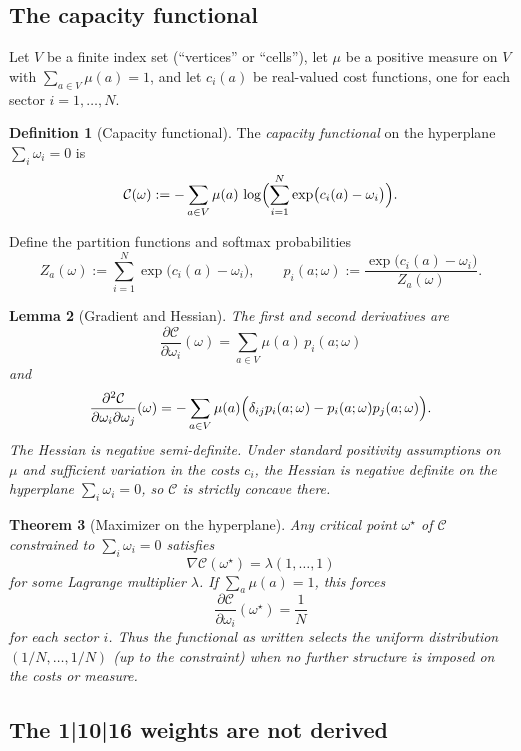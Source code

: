 \documentclass[11pt]{article}
\theoremstyle{plain}
\newtheorem{theorem}{Theorem}[section]
\newtheorem{lemma}[theorem]{Lemma}
\theoremstyle{definition}
\newtheorem{definition}[theorem]{Definition}
\theoremstyle{remark}
\numberwithin{equation}{section}
\newcommand{\capacity}{\mathcal{C}}
\begin{document}
\subsection{The capacity functional}

Let $V$ be a finite index set (``vertices'' or ``cells''), let $\mu$ be a positive measure on $V$ with $\sum_{a\in V}\mu(a)=1$, and let $c_i(a)$ be real-valued cost functions, one for each sector $i=1,\dots,N$.

\begin{definition}[Capacity functional]\label{def:capacity}
The \emph{capacity functional} on the hyperplane $\sum_i\omega_i=0$ is
\[
\capacity(\omega) := -\sum_{a\in V}\mu(a)\,\log\Bigl(\sum_{i=1}^N\exp\bigl(c_i(a)-\omega_i\bigr)\Bigr).
\]
\end{definition}

Define the partition functions and softmax probabilities
\[
Z_a(\omega) := \sum_{i=1}^N\exp\bigl(c_i(a)-\omega_i\bigr),\qquad
p_i(a;\omega) := \frac{\exp\bigl(c_i(a)-\omega_i\bigr)}{Z_a(\omega)}.
\]

\begin{lemma}[Gradient and Hessian]\label{lem:capacity-derivatives}
The first and second derivatives are
\[
\frac{\partial\capacity}{\partial\omega_i}(\omega) = \sum_{a\in V}\mu(a)\,p_i(a;\omega)
\]
and
\[
\frac{\partial^2\capacity}{\partial\omega_i\partial\omega_j}(\omega)
= -\sum_{a\in V}\mu(a)\Bigl(\delta_{ij}p_i(a;\omega)-p_i(a;\omega)p_j(a;\omega)\Bigr).
\]
The Hessian is negative semi-definite. Under standard positivity assumptions on $\mu$ and sufficient variation in the costs $c_i$, the Hessian is negative definite on the hyperplane $\sum_i\omega_i=0$, so $\capacity$ is strictly concave there.
\end{lemma}

\begin{theorem}[Maximizer on the hyperplane]\label{thm:capacity-max}
Any critical point $\omega^\star$ of $\capacity$ constrained to $\sum_i\omega_i=0$ satisfies
\[
\nabla\capacity(\omega^\star) = \lambda(1,\dots,1)
\]
for some Lagrange multiplier $\lambda$. If $\sum_a\mu(a)=1$, this forces
\[
\frac{\partial\capacity}{\partial\omega_i}(\omega^\star) = \frac1N
\]
for each sector $i$. Thus the functional as written selects the uniform distribution $(1/N,\dots,1/N)$ (up to the constraint) when no further structure is imposed on the costs or measure.
\end{theorem}

\subsection{The 1|10|16 weights are not derived}
\end{document}
